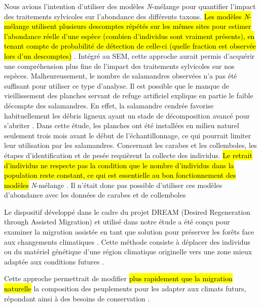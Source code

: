 Nous avions l’intention d’utiliser des modèles \textit{N}-mélange pour quantifier l'impact des traitements sylvicoles sur l'abondance des différents taxons. 
\hl{Les modèles \textit{N}-mélange utilisent plusieurs descomptes répétés sur les mêmes sites pour estimer l'abondance réelle d'une espèce (combien d'individus sont vraiment présents), en tenant compte de probabilité de détection de celle-ci (quelle fraction est observée lors d'un descomptes)} \citep{Royle2004Nmixturemodels,Mazerolle2021Woodlandsalamander}. 
Intégré au SEM, cette approche aurait permis d'acquérir une compréhension plus fine de l'impact des traitements sylvicoles sur nos espèces. 
Malheureusement, le nombre de salamandres observées n'a pas été suffisant pour utiliser ce type d'analyse. 
Il est possible que le manque de vieillissement des planches servant de refuge artificiel explique en partie le faible décompte des salamandres. 
En effet, la salamandre cendrée favorise habituellement les débris ligneux ayant un stade de décomposition avancé pour s'abriter \citep{Otto2011ComparingCover,hedrickEffectsCoverboardAge2021}. 
Dans cette étude, les planches ont été installées en milieu naturel seulement trois mois avant le début de l'échantillonnage, ce qui pourrait limiter leur utilisation par les salamandres. 
Concernant les carabes et les collemboles, les étapes d’identification et de pesée requièrent la collecte des individus. 
\hl{Le retrait d’individus ne respecte pas la condition que le nombre d’individus dans la population reste constant, ce qui est essentielle au bon fonctionnement des modèles} \textit{N}-mélange \citep{Royle2004Nmixturemodels}. 
Il n’était donc pas possible d’utiliser ces modèles d’abondance avec les données de carabes et de collemboles

Le dispositif développé dans le cadre du projet DREAM (Desired Regeneration through Assisted Migration) et utilisé dans notre étude a été conçu pour examiner la migration assistée en tant que solution pour préserver les forêts face aux changements climatiques \citep{royoDesiredREgenerationAssisted2023}. 
Cette méthode consiste à déplacer des individus ou du matériel génétique d’une région climatique originelle vers une zone mieux adaptée aux conditions futures \citep{Vitt2010Assistedmigration}. 

Cette approche permettrait de modifier \hl{plus rapidement que la migration naturelle} la composition des peuplements pour les adapter aux climats futurs, répondant ainsi à des besoins de conservation \citep{Dumroese2015Considerationsrestoring,Park2018Informationunderload,Park2023Provenancetrials}. 

